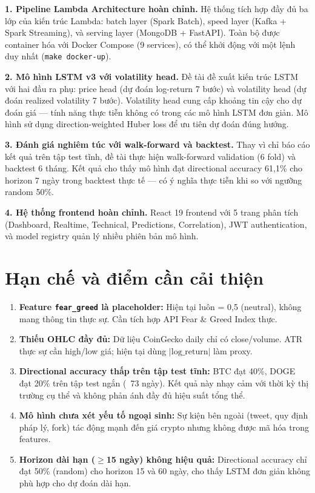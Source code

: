 \documentclass[12pt, a4paper]{report}
\begin{document}
\textbf{1. Pipeline Lambda Architecture hoàn chỉnh.} Hệ thống tích hợp đầy đủ ba lớp
của kiến trúc Lambda: batch layer (Spark Batch), speed layer (Kafka + Spark Streaming),
và serving layer (MongoDB + FastAPI). Toàn bộ được container hóa với Docker Compose
(9 services), có thể khởi động với một lệnh duy nhất (\texttt{make docker-up}).

\textbf{2. Mô hình LSTM v3 với volatility head.} Đề tài đề xuất kiến trúc LSTM với
hai đầu ra phụ: price head (dự đoán log-return 7 bước) và volatility head (dự đoán
realized volatility 7 bước). Volatility head cung cấp khoảng tin cậy cho dự đoán giá
--- tính năng thực tiễn không có trong các mô hình LSTM đơn giản. Mô hình sử dụng
direction-weighted Huber loss để ưu tiên dự đoán đúng hướng.

\textbf{3. Đánh giá nghiêm túc với walk-forward và backtest.} Thay vì chỉ báo cáo kết
quả trên tập test tĩnh, đề tài thực hiện walk-forward validation (6 fold) và backtest 6
tháng. Kết quả cho thấy mô hình đạt directional accuracy 61,1\% cho horizon 7 ngày trong
backtest thực tế --- có ý nghĩa thực tiễn khi so với ngưỡng random 50\%.

\textbf{4. Hệ thống frontend hoàn chỉnh.} React 19 frontend với 5 trang phân tích
(Dashboard, Realtime, Technical, Predictions, Correlation), JWT authentication, và
model registry quản lý nhiều phiên bản mô hình.

\section{Hạn chế và điểm cần cải thiện}

\begin{enumerate}
  \item \textbf{Feature \texttt{fear\_greed} là placeholder:} Hiện tại luôn = 0,5 (neutral),
    không mang thông tin thực sự. Cần tích hợp API Fear \& Greed Index thực.

  \item \textbf{Thiếu OHLC đầy đủ:} Dữ liệu CoinGecko daily chỉ có close/volume. ATR thực
    sự cần high/low giá; hiện tại dùng $|\text{log\_return}|$ làm proxy.

  \item \textbf{Directional accuracy thấp trên tập test tĩnh:} BTC đạt 40\%, DOGE đạt 20\%
    trên tập test ngắn (~73 ngày). Kết quả này nhạy cảm với thời kỳ thị trường cụ thể và
    không phản ánh đầy đủ hiệu suất tổng thể.

  \item \textbf{Mô hình chưa xét yếu tố ngoại sinh:} Sự kiện bên ngoài (tweet, quy định
    pháp lý, fork) tác động mạnh đến giá crypto nhưng không được mã hóa trong features.

  \item \textbf{Horizon dài hạn ($\geq$15 ngày) không hiệu quả:} Directional accuracy chỉ
    đạt 50\% (random) cho horizon 15 và 60 ngày, cho thấy LSTM đơn giản không phù hợp
    cho dự đoán dài hạn.
\end{enumerate}
\end{document}
